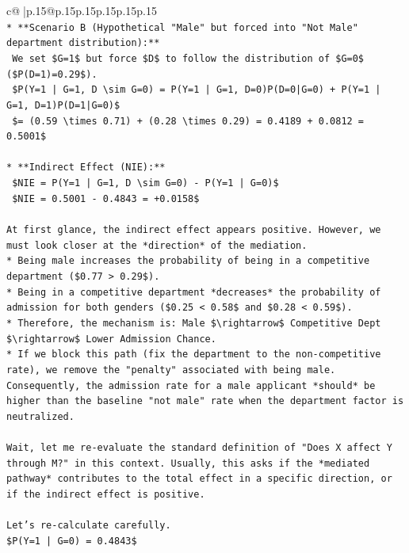 \documentclass{article}
\begin{document}
{\begin{supertabular}{c@{$\;$}|p{.15\linewidth}@{}p{.15\linewidth}p{.15\linewidth}p{.15\linewidth}p{.15\linewidth}p{.15\linewidth}}
{{{\\ 
\texttt{*   **Scenario B (Hypothetical "Male" but forced into "Not Male" department distribution):**} \\
\texttt{    We set \$G=1\$ but force \$D\$ to follow the distribution of \$G=0\$ (\$P(D=1)=0.29\$).} \\
\texttt{    \$P(Y=1 | G=1, D \textbackslash{}sim G=0) = P(Y=1 | G=1, D=0)P(D=0|G=0) + P(Y=1 | G=1, D=1)P(D=1|G=0)\$} \\
\texttt{    \$= (0.59 \textbackslash{}times 0.71) + (0.28 \textbackslash{}times 0.29) = 0.4189 + 0.0812 = 0.5001\$} \\
\\ 
\texttt{*   **Indirect Effect (NIE):**} \\
\texttt{    \$NIE = P(Y=1 | G=1, D \textbackslash{}sim G=0) {-} P(Y=1 | G=0)\$} \\
\texttt{    \$NIE = 0.5001 {-} 0.4843 = +0.0158\$} \\
\\ 
\texttt{At first glance, the indirect effect appears positive. However, we must look closer at the *direction* of the mediation.} \\
\texttt{*   Being male increases the probability of being in a competitive department (\$0.77 > 0.29\$).} \\
\texttt{*   Being in a competitive department *decreases* the probability of admission for both genders (\$0.25 < 0.58\$ and \$0.28 < 0.59\$).} \\
\texttt{*   Therefore, the mechanism is: Male \$\textbackslash{}rightarrow\$ Competitive Dept \$\textbackslash{}rightarrow\$ Lower Admission Chance.} \\
\texttt{*   If we block this path (fix the department to the non{-}competitive rate), we remove the "penalty" associated with being male. Consequently, the admission rate for a male applicant *should* be higher than the baseline "not male" rate when the department factor is neutralized.} \\
\\ 
\texttt{Wait, let me re{-}evaluate the standard definition of "Does X affect Y through M?" in this context. Usually, this asks if the *mediated pathway* contributes to the total effect in a specific direction, or if the indirect effect is positive.} \\
\\ 
\texttt{Let's re{-}calculate carefully.} \\
\texttt{\$P(Y=1 | G=0) = 0.4843\$} \\
}}}
\end{supertabular}}
\end{document}
